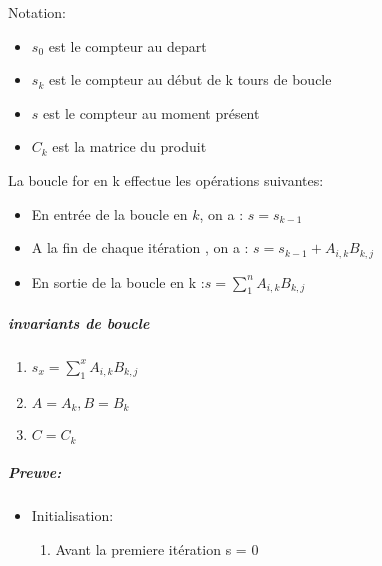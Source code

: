 \documentclass[12pt]{report}
\begin{document}
Notation:

\begin{itemize}
\item $s_0$  est le compteur au depart
\item $s_k$  est le compteur au début de k tours de boucle
\item $s$ est le compteur au moment présent 
\item $C_k$ est la matrice du produit
\end{itemize}

La boucle for en k  effectue les opérations suivantes:

\begin{itemize}
\item En entrée de la boucle en $k$, on a : $s = s_{k-1}$
\item A la fin de chaque itération , on a : $s = s_{k-1} + A_{i,k}B_{k,j}$
\item En sortie de la boucle en k :$ s = \sum_1^n A_{i,k}B_{k,j}$
\end{itemize}

\subparagraph*{invariants de boucle}

\begin{enumerate}
 \item $s_x = \sum_1^x  A_{i,k}B_{k,j}$
 \item $ A = A_k, B = B_k$
 \item $ C = C_k$
\end{enumerate}

\subparagraph*{Preuve:}

\begin{itemize}
\item Initialisation:\\
\begin{enumerate}
\item Avant la premiere itération s = 0
\end{enumerate}
\end{itemize}
\end{document}
